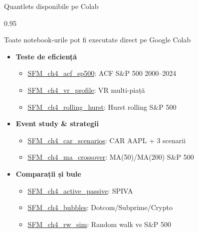 \documentclass[9pt, aspectratio=169, t]{beamer}
\begin{document}
\begin{frame}[shrink=15]{Quantlets disponibile pe Colab}
\begin{cminipage}{0.95\textwidth}
\begin{block}{Toate notebook-urile pot fi executate direct pe Google Colab}
\begin{itemize}\setlength{\itemsep}{0pt}
    \item \textbf{Teste de eficiență}
    \begin{itemize}\setlength{\itemsep}{0pt}
        \item \href{https://colab.research.google.com/github/QuantLet/Stat_fin_markets/blob/master/Ch_04/SFM_ch4_acf_sp500/SFM_ch4_acf_sp500.ipynb}{SFM\_ch4\_acf\_sp500}: ACF S\&P 500 2000--2024
        \item \href{https://colab.research.google.com/github/QuantLet/Stat_fin_markets/blob/master/Ch_04/SFM_ch4_vr_profile/SFM_ch4_vr_profile.ipynb}{SFM\_ch4\_vr\_profile}: VR multi-piață
        \item \href{https://colab.research.google.com/github/QuantLet/Stat_fin_markets/blob/master/Ch_04/SFM_ch4_rolling_hurst/SFM_ch4_rolling_hurst.ipynb}{SFM\_ch4\_rolling\_hurst}: Hurst rolling S\&P 500
    \end{itemize}
    \item \textbf{Event study \& strategii}
    \begin{itemize}\setlength{\itemsep}{0pt}
        \item \href{https://colab.research.google.com/github/QuantLet/Stat_fin_markets/blob/master/Ch_04/SFM_ch4_car_scenarios/SFM_ch4_car_scenarios.ipynb}{SFM\_ch4\_car\_scenarios}: CAR AAPL + 3 scenarii
        \item \href{https://colab.research.google.com/github/QuantLet/Stat_fin_markets/blob/master/Ch_04/SFM_ch4_ma_crossover/SFM_ch4_ma_crossover.ipynb}{SFM\_ch4\_ma\_crossover}: MA(50)/MA(200) S\&P 500
    \end{itemize}
    \item \textbf{Comparații și bule}
    \begin{itemize}\setlength{\itemsep}{0pt}
        \item \href{https://colab.research.google.com/github/QuantLet/Stat_fin_markets/blob/master/Ch_04/SFM_ch4_active_passive/SFM_ch4_active_passive.ipynb}{SFM\_ch4\_active\_passive}: SPIVA
        \item \href{https://colab.research.google.com/github/QuantLet/Stat_fin_markets/blob/master/Ch_04/SFM_ch4_bubbles/SFM_ch4_bubbles.ipynb}{SFM\_ch4\_bubbles}: Dotcom/Subprime/Crypto
        \item \href{https://colab.research.google.com/github/QuantLet/Stat_fin_markets/blob/master/Ch_04/SFM_ch4_rw_sim/SFM_ch4_rw_sim.ipynb}{SFM\_ch4\_rw\_sim}: Random walk vs S\&P 500
    \end{itemize}
\end{itemize}
\end{block}
\end{cminipage}
\end{frame}
\end{document}
